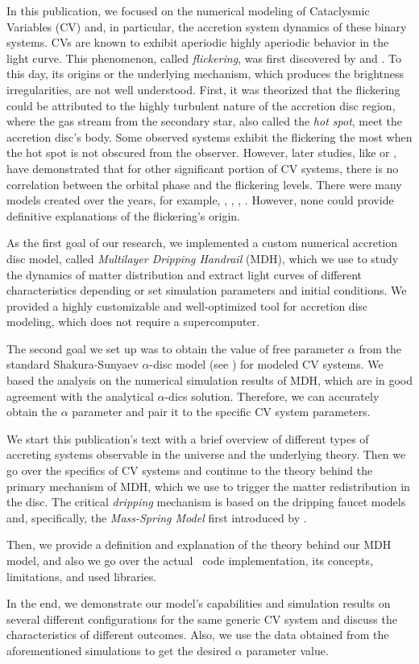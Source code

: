 In this publication, we focused on the numerical modeling of Cataclysmic Variables (CV) and, in particular, the accretion system dynamics of these binary systems. CVs are known to exhibit aperiodic highly aperiodic behavior in the light curve. This phenomenon, called \emph{flickering}, was first discovered by \citep{henize1949} and \citep{lenouvel1954}. To this day, its origins or the underlying mechanism, which produces the brightness irregularities, are not well understood. First, it was theorized that the flickering could be attributed to the highly turbulent nature of the accretion disc region, where the gas stream from the secondary star, also called the \emph{hot spot}, meet the accretion disc's body. Some observed systems exhibit the flickering the most when the hot spot is not obscured from the observer. However, later studies, like \citep{patterson1981} or \citep{wood1986}, have demonstrated that for other significant portion of CV systems, there is no correlation between the orbital phase and the flickering levels. There were many models created over the years, for example, \citep{dobrotka2012}, \citep{kley1997}, \citep{lyubarskii1997}, \citep{yonehara1997}. However, none could provide definitive explanations of the flickering's origin.  

As the first goal of our research, we implemented a custom numerical accretion disc model, called \emph{Multilayer Dripping Handrail} (MDH), which we use to study the dynamics of matter distribution and extract light curves of different characteristics depending or set simulation parameters and initial conditions. We provided a highly customizable and well-optimized tool for accretion disc modeling, which does not require a supercomputer. 

The second goal we set up was to obtain the value of free parameter $\alpha$ from the standard Shakura-Sunyaev $\alpha$-disc model (see \citep{shakura1973}) for modeled CV systems. We based the analysis on the numerical simulation results of MDH, which are in good agreement with the analytical $\alpha$-dics solution. Therefore, we can accurately obtain the $\alpha$ parameter and pair it to the specific CV system parameters. 

We start this publication's text with a brief overview of different types of accreting systems observable in the universe and the underlying theory. Then we go over the specifics of CV systems and continue to the theory behind the primary mechanism of MDH, which we use to trigger the matter redistribution in the disc. The critical \emph{dripping} mechanism is based on the dripping faucet models and, specifically, the \emph{Mass-Spring Model} first introduced by \citep{shaw1984}. 

Then, we provide a definition and explanation of the theory behind our MDH model, and also we go over the actual \CC\ code implementation, its concepts, limitations, and used libraries. 

In the end, we demonstrate our model's capabilities and simulation results on several different configurations for the same generic CV system and discuss the characteristics of different outcomes. Also, we use the data obtained from the aforementioned simulations to get the desired $\alpha$ parameter value. 
